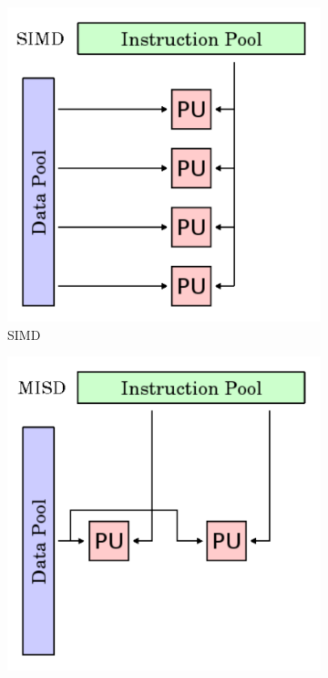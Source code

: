 \documentclass[a4paper, 11pt]{report}
\begin{document}
\begin{figure}[h]
\begin{subfigure}[t]{0.4\textwidth}
		\includegraphics[scale=.3]{images/simd.pdf}
		\caption{SIMD}\label{fig:simd}
	\end{subfigure}
	\begin{subfigure}[t]{0.4\textwidth}
		\centering
		\includegraphics[scale=.3]{images/misd.pdf}

\end{subfigure}
\end{figure}
\end{document}
